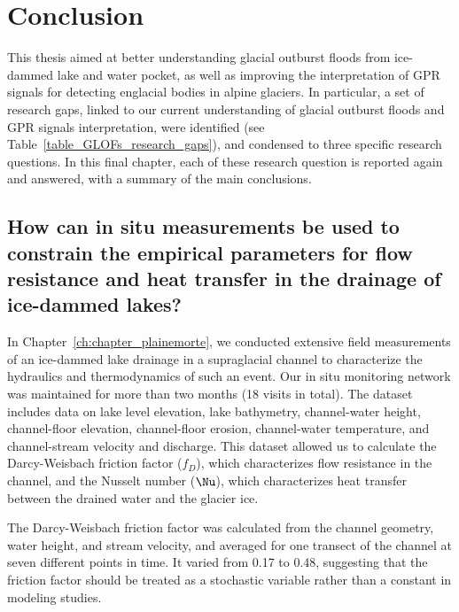 \chapter{Conclusion}
\label{ch:summary}

This thesis aimed at better understanding glacial outburst floods from ice-dammed lake and water pocket, as well as improving the interpretation of GPR signals for detecting englacial bodies in alpine glaciers. In particular, a set of research gaps, linked to our current understanding of glacial outburst floods and GPR signals interpretation, were identified (see Table~\ref{table_GLOFs_research_gaps}), and condensed to three specific research questions. In this final chapter, each of these research question is reported again and answered, with a summary of the main conclusions.

\section{How can in situ measurements be used to constrain the empirical parameters for flow resistance and heat transfer in the drainage of ice-dammed lakes?}

In Chapter~\ref{ch:chapter_plainemorte}, we conducted extensive field measurements of an ice-dammed lake drainage in a supraglacial channel to characterize the hydraulics and thermodynamics of such an event. Our in situ monitoring network was maintained for more than two months (18 visits in total). The dataset includes data on lake level elevation, lake bathymetry, channel-water height, channel-floor elevation, channel-floor erosion, channel-water temperature, and channel-stream velocity and discharge. This dataset allowed us to calculate the Darcy-Weisbach friction factor ($f_D$), which characterizes flow resistance in the channel, and the Nusselt number ($\Nu$), which characterizes heat transfer between the drained water and the glacier ice.
%

The Darcy-Weisbach friction factor was calculated from the channel geometry, water height, and stream velocity, and averaged for one transect of the channel at seven different points in time. It varied from 0.17 to 0.48, suggesting that the friction factor should be treated as a stochastic variable rather than a constant in modeling studies.
%

